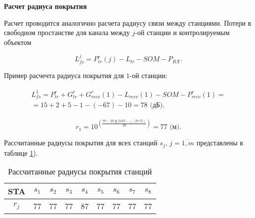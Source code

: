 \textbf{Расчет радиуса покрытия}



Расчет проводится аналогично расчета радиусу связи между станциями. 
Потери в свободном простанстве для канала между $j$-ой станции и контролируемым объектом

\begin{displaymath}
  L_{fs}^{j} = P_{tr}^r(j) - L_{tr}  - SOM - P_{RX}. 
\end{displaymath}


Пример расчечта радиуса покрытия для  $1$-ой станции:

\begin{align}
    \begin{aligned}
  L_{fs}^{1} = P_{tr}^r + G_{tr}^r + G_{recv}^r(1) - L_{recv}(1)  - SOM - P_{recv}^r(1) = \\
 = 15+2+5-1-(-67)-10 = 78 \text{ (дБ)}.
    \end{aligned}
\end{align}

\begin{displaymath}
  r_{1} = 10^{\left(\frac{78 - 20\lg{2437} - (-27.55)}{20}\right)} = 77 \text{ (м)}.
\end{displaymath}

Рассчитанные радиусы покрытия для всех станций $ s_j $, $ j = \overline{1, m} $ представлены в таблице \cref{tab:part3_rj}).

\begin{table}[h!]\begin{center}
  \begin{tabular}{|c||c|c|c|c|c|c|c|c|}\hline
      STA & $s_1$ & $s_2$ & $s_3$ & $s_4$ & $s_5$ & $s_6$ & $s_7$ & $s_8$\\ \hline \hline

      $r_{j}$ & 77 & 77 & 77 & 87 & 77 & 77 & 77 & 77\\ \hline

\end{tabular}\caption{Рассчитанные радиусы покрытия станций}\label{tab:part3_rj}
\end{center}\end{table}

